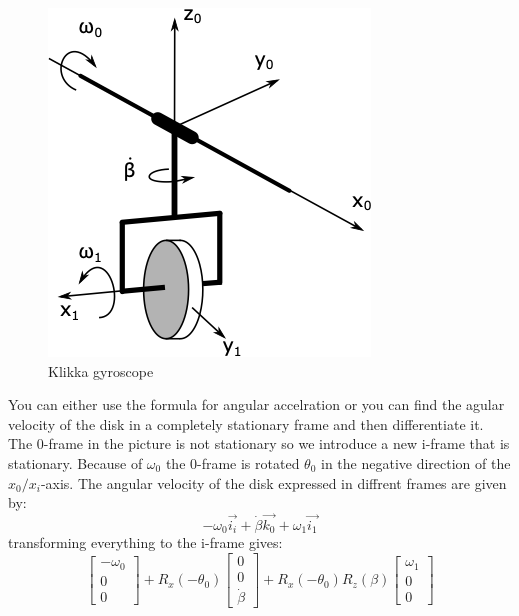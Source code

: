 \begin{figure}[H]
    \centering
    \includegraphics[scale = 0.7]{figures/klikka_eksempel.png}
    \caption{Klikka gyroscope}
    \label{fig:hardcoregyro}
\end{figure}

You can either use the formula for angular accelration or you can find the agular velocity of the disk in a completely stationary frame and then differentiate it. The 0-frame in the picture is not stationary so we introduce a new i-frame that is stationary. Because of $\omega_0$ the 0-frame is rotated $\theta_0$ in the negative direction of the $x_0/x_i$-axis.
The angular velocity of the disk expressed in diffrent frames are given by:
\begin{equation}
    -\omega_0\vec{i_i} + \dot{\beta}\vec{k_0} + \omega_1 \vec{i_1}
\end{equation}
transforming everything to the i-frame gives:
\begin{equation}
    \begin{bmatrix}
        -\omega_0 \\
        0\\
        0
    \end{bmatrix}
    +
    R_x(-\theta_0)
    \begin{bmatrix}
        0 \\
        0\\
        \dot{\beta}
    \end{bmatrix}
    +
    R_x(-\theta_0)R_z(\beta)
    \begin{bmatrix}
        \omega_1 \\
        0\\
        0
    \end{bmatrix}
\end{equation}

